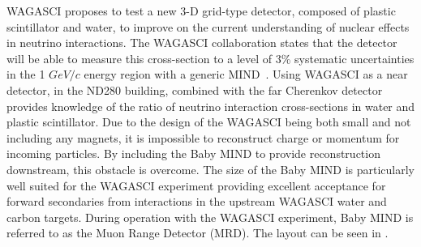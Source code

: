 WAGASCI proposes to test a new 3-D grid-type detector, composed of plastic scintillator and water, to improve on the current understanding of nuclear effects in neutrino interactions. The WAGASCI collaboration states that the detector will be able to measure this cross-section to a level of 3\% systematic uncertainties in the 1 $GeV/c$ energy region with a generic MIND~\cite{30WAGASCI}. %
Using WAGASCI as a near detector, in the ND280 building, combined with the far Cherenkov detector provides knowledge of the ratio of neutrino interaction cross-sections in water and plastic scintillator. Due to the design of the WAGASCI being both small and not including any magnets, it is impossible to reconstruct charge or momentum for incoming particles. By including the Baby MIND to provide reconstruction downstream, this obstacle is overcome. The size of the Baby MIND is particularly well suited for the WAGASCI experiment providing excellent acceptance for forward secondaries from interactions in the upstream WAGASCI water and carbon targets. During operation with the WAGASCI experiment, Baby MIND is referred to as the Muon Range Detector (MRD). The layout can be seen in .




